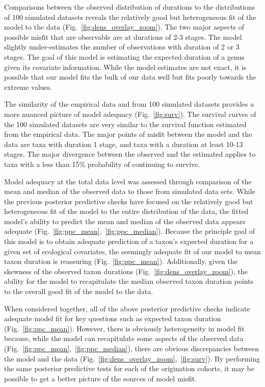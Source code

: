 \documentclass[11pt]{article}
\begin{document}

Comparisons between the observed distribution of durations to the distributions of 100 simulated datasets reveals the relatively good but heterogeneous fit of the model to the data (Fig.~\ref{fig:dens_overlay_zoom}). The two major aspects of possible misfit that are observable are at durations of 2-3 stages. The model slightly under-estimates the number of observations with duration of 2 or 3 stages. The goal of this model is estimating the expected duration of a genus given its covariate information. While the model estimates are not exact, it is possible that our model fits the bulk of our data well but fits poorly towards the extreme values.

The similarity of the empirical data and from 100 simulated datasets provides a more nuanced picture of model adequacy (Fig.~\ref{fig:surv}). The survival curves of the 100 simulated datasets are very similar to the survival function estimated from the empirical data. The major points of misfit between the model and the data are taxa with duration 1 stage, and taxa with a duration at least 10-13 stages. The major divergence between the observed and the estimated applies to taxa with a less than 15\% probability of continuing to survive. 

Model adequacy at the total data level was assessed through comparison of the mean and median of the observed data to those from simulated data sets. While the previous posterior predictive checks have focused on the relatively good but heterogeneous fit of the model to the entire distribution of the data, the fitted model's ability to predict the mean and median of the observed data appears adequate (Fig.~\ref{fig:ppc_mean},~\ref{fig:ppc_median}). Because the principle goal of this model is to obtain adequate prediction of a taxon's expected duration for a given set of ecological covariates, the seemingly adequate fit of our model to mean taxon duration is reassuring (Fig.~\ref{fig:ppc_mean}). Additionally, given the skewness of the observed taxon durations (Fig.~\ref{fig:dens_overlay_zoom}), the ability for the model to recapitulate the median observed taxon duration points to the overall good fit of the model to the data.

When considered together, all of the above posterior predictive checks indicate adequate model fit for key questions such as expected taxon duration (Fig.~\ref{fig:ppc_mean}). However, there is obviously heterogeneity in model fit because, while the model can recapitulate some aspects of the observed data (Fig.~\ref{fig:ppc_mean},~\ref{fig:ppc_median}), there are obvious discrepancies between the model and the data (Fig.~\ref{fig:dens_overlay_zoom},~\ref{fig:surv}). By performing the same posterior predictive tests for each of the origination cohorts, it may be possible to get a better picture of the sources of model misfit.
\end{document}

